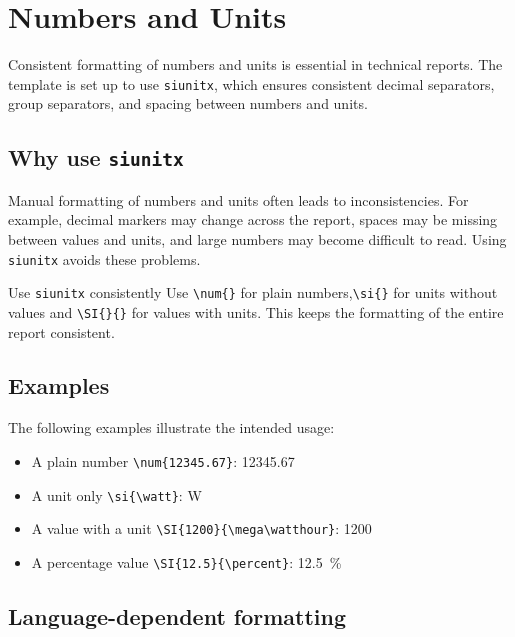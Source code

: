 \documentclass[11pt,a4paper]{report}
\begin{document}
\chapter{Numbers and Units}

Consistent formatting of numbers and units is essential in technical reports. The template is set up to use \texttt{siunitx}, which ensures consistent decimal separators, group separators, and spacing between numbers and units.

\section{Why use \texttt{siunitx}}

Manual formatting of numbers and units often leads to inconsistencies. For example, decimal markers may change across the report, spaces may be missing between values and units, and large numbers may become difficult to read. Using \texttt{siunitx} avoids these problems.

\begin{coloredBlock}[blue]{Use \texttt{siunitx} consistently}
Use \texttt{\textbackslash num\{\}} for plain numbers,\texttt{\textbackslash si\{\}} for units without values and \texttt{\textbackslash SI\{\}\{\}} for values with units. This keeps the formatting of the entire report consistent.
\end{coloredBlock}

\section{Examples}

The following examples illustrate the intended usage:

\begin{itemize}
    \item A plain number \texttt{\textbackslash num\{12345.67\}}: \num{12345.67} 
    \item A unit only \texttt{\textbackslash si\{\textbackslash watt\}}: \si{\watt}
    \item A value with a unit \texttt{\textbackslash SI\{1200\}\{\textbackslash mega\textbackslash watthour\}}: \SI{1200}{\mega\watthour}
    \item A percentage value \texttt{\textbackslash SI\{12.5\}\{\textbackslash percent\}}: \SI{12.5}{\percent}

\end{itemize}

\section{Language-dependent formatting}
\end{document}
